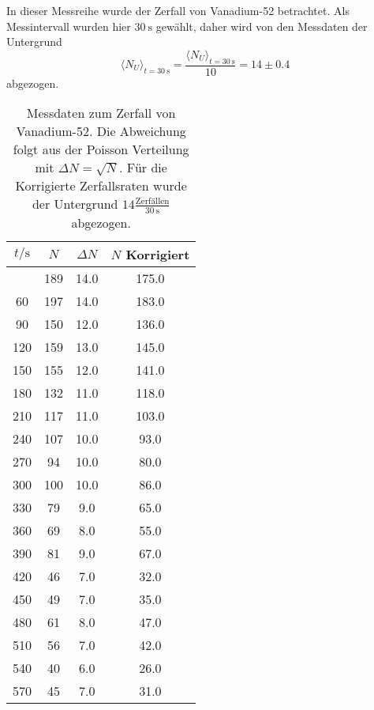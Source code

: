 In dieser Messreihe wurde der Zerfall von Vanadium-52 betrachtet. Als Messintervall wurden hier
$\SI{30}{\second}$ gewählt, daher wird von den Messdaten der Untergrund
\begin{equation}
	\langle N_U \rangle_{t=\SI{30}{\second}} = 
	\frac{\langle N_U \rangle_{t=\SI{30}{\second}}}{10} = 14 \pm 0.4
\end{equation}
abgezogen.

\begin{longtable}{c c c c}
	\caption{Messdaten zum Zerfall von Vanadium-52. Die Abweichung folgt aus der Poisson Verteilung
		mit $\Delta N = \sqrt{N}$. Für die Korrigierte Zerfallsraten wurde der Untergrund 
	$14 \frac{\text{Zerfällen}}{\SI{30}{\second}}$ abgezogen.}\\
		\hline
		$t / \si{\second}$ & $N$ & $\Delta N$ &$N$ Korrigiert \\
		\hline
		\endhead
		\hline
		\endfoot
		30   	&      189  	& 14.0 &      175.0 \\
		  60   	&      197  	& 14.0 &      183.0 \\
		  90   	&      150  	& 12.0 &      136.0 \\
		 120   	&      159  	& 13.0 &      145.0 \\
		 150   	&      155  	& 12.0 &      141.0 \\
		 180   	&      132  	& 11.0 &      118.0 \\
		 210   	&      117  	& 11.0 &      103.0 \\
		 240   	&      107  	& 10.0 &       93.0 \\
		 270   	&       94  	& 10.0 &       80.0 \\
		 300   	&      100  	& 10.0 &       86.0 \\
		 330   	&       79  	&  9.0 &       65.0 \\
		 360   	&       69  	&  8.0 &       55.0 \\
		 390   	&       81  	&  9.0 &       67.0 \\
		 420   	&       46  	&  7.0 &       32.0 \\
		 450   	&       49  	&  7.0 &       35.0 \\
		 480   	&       61  	&  8.0 &       47.0 \\
		 510   	&       56  	&  7.0 &       42.0 \\
		 540   	&       40  	&  6.0 &       26.0 \\
		 570   	&       45  	&  7.0 &       31.0 \\

\end{longtable}
